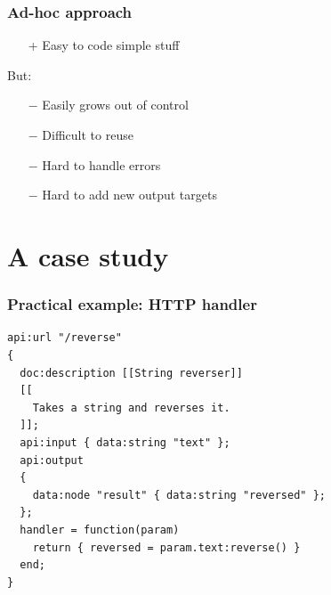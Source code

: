 \documentclass[handout]{beamer}
\begin{document}

\begin{frame}

\frametitle{Ad-hoc approach}

\begin{itemize}
\item[+] Easy to code simple stuff
\end{itemize}

But:

\begin{itemize}
\item[$-$] Easily grows out of control
\item[$-$] Difficult to reuse
\item[$-$] Hard to handle errors
\item[$-$] Hard to add new output targets
\end{itemize}

\end{frame}


\section{A case study}


\begin{frame}[fragile]

\frametitle{Practical example: HTTP handler}

\begin{verbatim}
api:url "/reverse"
{
  doc:description [[String reverser]]
  [[
    Takes a string and reverses it.
  ]];
  api:input { data:string "text" };
  api:output
  {
    data:node "result" { data:string "reversed" };
  };
  handler = function(param)
    return { reversed = param.text:reverse() }
  end;
}
\end{verbatim}

\end{frame}

\end{document}
